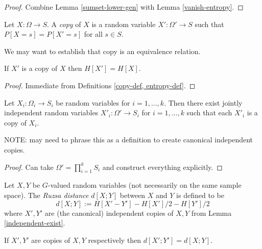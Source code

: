 \begin{proof}  Combine Lemma \ref{sumset-lower-gen} with Lemma \ref{vanish-entropy}.
\end{proof}

\begin{definition}[Copy]\label{copy-def}  Let $X : \Omega \to S$.  A \emph{copy} of $X$ is a random variable $X' : \Omega' \to S$ such that $P[X=s] = P[X'=s]$ for all $s \in S$.
\end{definition}

We may want to establish that copy is an equivalence relation.

\begin{lemma}\label{copy-ent} If $X'$ is a copy of $X$ then $H[X'] = H[X]$.
\end{lemma}

\begin{proof} Immediate from Definitions \ref{copy-def, entropy-def}.
\end{proof}

\begin{lemma}\label{independent-exist}  Let $X_i : \Omega_i \to S_i$ be random variables for $i=1,\dots,k$.  Then there exist jointly independent random variables $X'_i: \Omega' \to S_i$ for $i=1,\dots,k$ such that each $X'_i$ is a copy of $X_i$.
\end{lemma}

NOTE: may need to phrase this as a definition to create canonical independent copies.

\begin{proof} Can take $\Omega' = \prod_{i=1}^k S_i$ and construct everything explicitly.
\end{proof}

\begin{definition}\label{ruz-dist-def}  Let $X,Y$ be $G$-valued random variables (not necessarily on the same sample space).  The \emph{Ruzsa distance} $d[X;Y]$ between $X$ and $Y$ is defined to be
$$ d[X;Y] := H[X' - Y'] - H[X']/2 - H[Y']/2$$
where $X',Y'$ are (the canonical) independent copies of $X,Y$ from Lemma \ref{independent-exist}.
\end{definition}

\begin{lemma}\label{ruz-copy}  If $X',Y'$ are copies of $X,Y$ respectively then $d[X';Y']=d[X;Y]$.
\end{lemma}

